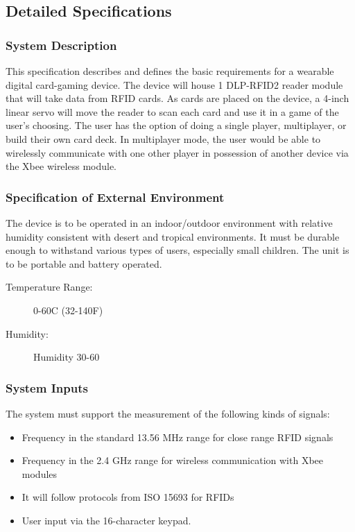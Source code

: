 \documentclass[12pt]{article} %
\begin{document}
\subsection{Detailed Specifications}\label{detailedSpec} %
\subsubsection{System Description}\label{designSystemSpec}

This specification describes and defines the basic requirements for a wearable digital card-gaming device. The device will house 1 DLP-RFID2 reader module that will take data from RFID cards. As cards are placed on the device, a 4-inch linear servo will move the reader to scan each card and use it in a game of the user’s choosing. The user has the option of doing a single player, multiplayer, or build their own card deck. In multiplayer mode, the user would be able to wirelessly communicate with one other player in possession of another device via the Xbee wireless module.

\subsubsection{Specification of External Environment}\label{designExtEnv}
The device is to be operated in an indoor/outdoor environment with relative humidity consistent with desert and tropical environments. It must be durable enough to withstand various types of users, especially small children.  The unit is to be portable and battery operated.

\begin{description}
	\item[Temperature Range:] 0-60C (32-140F)
	\item[Humidity:] Humidity 30-60%
\end{description}

\subsubsection{System Inputs}\label{inputs}
The system must support the measurement of the following kinds of signals:

\begin{itemize}
	\item Frequency in the standard 13.56 MHz range for close range RFID signals
	\item Frequency in the 2.4 GHz range for wireless communication with Xbee modules
	\item It will follow protocols from ISO 15693 for RFIDs
	\item User input via the 16-character keypad.
\end{itemize}
\end{document}
